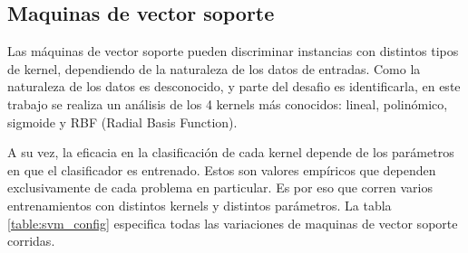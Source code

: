 \documentclass[journal]{IEEEtran}
\begin{document}
\subsection{Maquinas de vector soporte}
Las máquinas de vector soporte pueden discriminar instancias con distintos
tipos de kernel, dependiendo de la naturaleza de los datos de entradas. Como
la naturaleza de los datos es desconocido, y parte del desafio es identificarla,
en este trabajo se realiza un análisis de los 4 kernels más conocidos: lineal,
polinómico, sigmoide y RBF (Radial Basis Function).

A su vez, la eficacia en la clasificación de cada kernel depende de los
parámetros en que el clasificador es entrenado. Estos son valores empíricos
que dependen exclusivamente de cada problema en particular. Es por eso
que corren varios entrenamientos con distintos kernels y distintos parámetros.
La tabla \ref{table:svm_config} especifica todas las variaciones de maquinas 
de vector soporte corridas.
\end{document}
